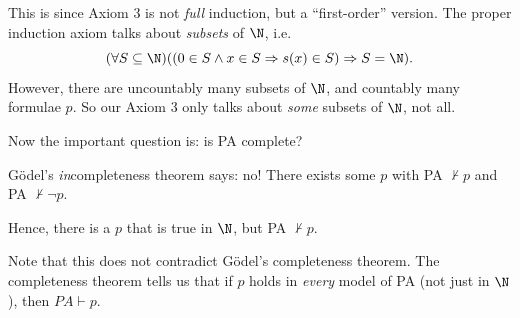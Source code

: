 \documentclass[a4paper]{article}
\begin{document}
This is since Axiom 3 is not \emph{full} induction, but a ``first-order'' version. The proper induction axiom talks about \emph{subsets} of $\N$, i.e.
\[
  (\forall S\subseteq \N )((0 \in S \wedge x\in S \Rightarrow s(x)\in S)\Rightarrow S=\N).
\]
However, there are uncountably many subsets of $\N$, and countably many formulae $p$. So our Axiom 3 only talks about \emph{some} subsets of $\N$, not all.

Now the important question is: is PA complete?

G\"odel's \emph{in}completeness theorem says: no! There exists some $p$ with PA $\not\vdash p$ and PA $\not\vdash \neg p$.

Hence, there is a $p$ that is true in $\N$, but PA $\not\vdash p$.

Note that this does not contradict G\"odel's completeness theorem. The completeness theorem tells us that if $p$ holds in \emph{every} model of PA (not just in $\N$), then $PA\vdash p$.
\end{document}
